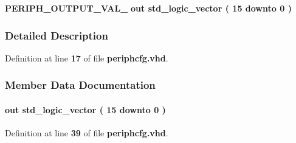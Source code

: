 \begin{DoxyCompactItemize}
\item 
{\bf P\+E\+R\+I\+P\+H\+\_\+\+O\+U\+T\+P\+U\+T\+\_\+\+V\+A\+L\+\_}  {\bfseries {\bfseries \textcolor{keywordflow}{out}\textcolor{vhdlchar}{ }}} {\bfseries \textcolor{comment}{std\+\_\+logic\+\_\+vector}\textcolor{vhdlchar}{ }\textcolor{vhdlchar}{(}\textcolor{vhdlchar}{ }\textcolor{vhdlchar}{ } \textcolor{vhdldigit}{15} \textcolor{vhdlchar}{ }\textcolor{keywordflow}{downto}\textcolor{vhdlchar}{ }\textcolor{vhdlchar}{ } \textcolor{vhdldigit}{0} \textcolor{vhdlchar}{ }\textcolor{vhdlchar}{)}\textcolor{vhdlchar}{ }} 
\end{DoxyCompactItemize}


\subsubsection{Detailed Description}


Definition at line {\bf 17} of file {\bf periphcfg.\+vhd}.



\subsubsection{Member Data Documentation}
\paragraph[{B\+O\+A\+R\+D\+\_\+\+G\+P\+I\+O\+\_\+\+D\+IR}]{ {\bfseries \textcolor{keywordflow}{out}\textcolor{vhdlchar}{ }} {\bfseries \textcolor{comment}{std\+\_\+logic\+\_\+vector}\textcolor{vhdlchar}{ }\textcolor{vhdlchar}{(}\textcolor{vhdlchar}{ }\textcolor{vhdlchar}{ } \textcolor{vhdldigit}{15} \textcolor{vhdlchar}{ }\textcolor{keywordflow}{downto}\textcolor{vhdlchar}{ }\textcolor{vhdlchar}{ } \textcolor{vhdldigit}{0} \textcolor{vhdlchar}{ }\textcolor{vhdlchar}{)}\textcolor{vhdlchar}{ }} \hspace{0.3cm}{\ttfamily [Port]}}\label{classperiphcfg_a1bac84f368fde7fbe39fe84059e67958}


Definition at line {\bf 39} of file {\bf periphcfg.\+vhd}.

